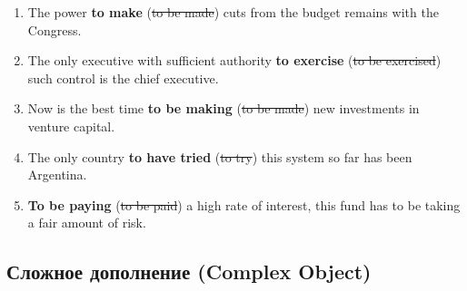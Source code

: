 \documentclass[main.tex]{subfiles}
\begin{document}
\begin{enumerate}[nosep,leftmargin=*]
	\item The power \textbf{to make} (\st{to be made}) cuts from the budget remains with the Congress.
	\item The only executive with sufficient authority \textbf{to exercise} (\st{to be exercised}) such control is the chief executive.
	\item Now is the best time \textbf{to be making} (\st{to be made}) new investments in venture capital.
	\item The only country \textbf{to have tried} (\st{to try}) this system so far has been Argentina.
	\item \textbf{To be paying} (\st{to be paid}) a high rate of interest, this fund has to be taking a fair amount of risk.
\end{enumerate}

\subsection{Сложное дополнение (Complex Object)}

\end{document}
